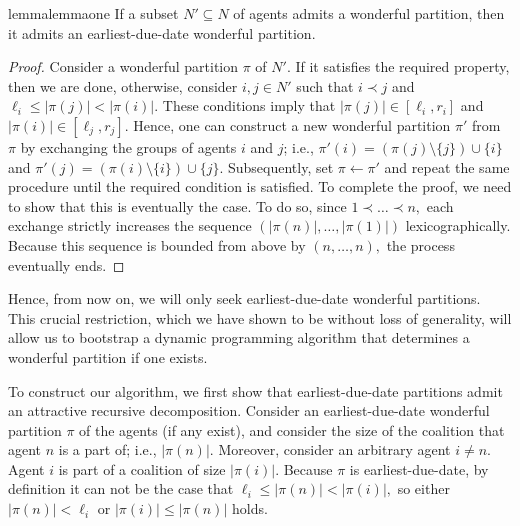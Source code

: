\documentclass[a4paper]{article}
\newcommand{\set}[1]{\{#1\}}
\newcommand{\modulus}[1]{\vert #1 \vert}
\begin{document}
\begin{restatable}{lemma}{lemmaone} If a subset $N' \subseteq N$ of agents admits a wonderful partition, then it admits an earliest-due-date wonderful partition. 
\end{restatable}
\begin{proof} Consider a wonderful partition $\pi$ of $N'.$ If it satisfies the required property, then we are done, otherwise, consider $i, j \in N'$ such that $i\prec j$ and $\ell_i \leq \modulus{\pi(j)} < \modulus{\pi(i)}.$ These conditions imply that $\modulus{\pi(j)} \in [\ell_i, r_i]$ and $\modulus{\pi(i)} \in [\ell_j, r_j].$ Hence, one can construct a new wonderful partition $\pi'$ from $\pi$ by exchanging the groups of agents $i$ and $j$; i.e., $\pi'(i) = (\pi(j) \setminus \set{j}) \cup \set{i}$ and $\pi'(j) = (\pi(i) \setminus \set{i}) \cup \set{j}.$ Subsequently, set $\pi \gets \pi'$ and repeat the same procedure until the required condition is satisfied. To complete the proof, we need to show that this is eventually the case. To do so, since $1 \prec \ldots \prec n,$ each exchange strictly increases the sequence $(\modulus{\pi(n)}, \ldots,\modulus{\pi(1)})$ lexicographically. Because this sequence is bounded from above by $(n, \ldots, n),$ the process eventually ends.
\end{proof}

\noindent Hence, from now on, we will only seek earliest-due-date wonderful partitions. This crucial restriction, which we have shown to be without loss of generality, will allow us to bootstrap a dynamic programming algorithm that determines a wonderful partition if one exists.

To construct our algorithm, we first show that earliest-due-date partitions admit an attractive recursive decomposition. 
Consider an earliest-due-date wonderful partition $\pi$ of the agents (if any exist), and consider the size of the coalition that agent $n$ is a part of; i.e., $\modulus{\pi(n)}.$ Moreover, consider an arbitrary agent $i \neq n.$ Agent $i$ is part of a coalition of size $\modulus{\pi(i)}.$ Because $\pi$ is earliest-due-date, by definition it can not be the case that $\ell_i \leq \modulus{\pi(n)} < \modulus{\pi(i)},$ so either $\modulus{\pi(n)} < \ell_i$ or $\modulus{\pi(i)} \leq \modulus{\pi(n)}$ holds.
\end{document}
